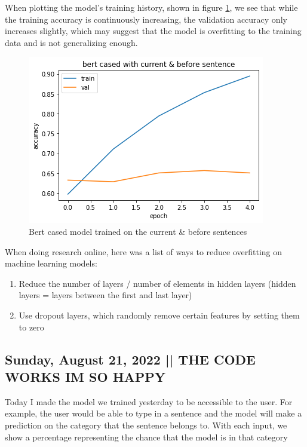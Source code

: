 \documentclass[11pt,letterpaper]{article}
\begin{document}
When plotting the model's training history, shown in figure \ref{fig:bert_cased_w_before}, we see that while the training accuracy is continuously increasing, the validation accuracy only increases slightly, which may suggest that the model is overfitting to the training data and is not generalizing enough.

\begin{figure}
    \centering
    \includegraphics[scale=0.7]{images/bert_cased_w_before.png}
    \caption{Bert cased model trained on the current & before sentences}
    \label{fig:bert_cased_w_before}
\end{figure}

When doing research online, here was a list of ways to reduce overfitting on machine learning models:
\begin{enumerate}
    \item Reduce the number of layers / number of elements in hidden layers (hidden layers = layers between the first and last layer)
    \item Use dropout layers, which randomly remove certain features by setting them to zero
\end{enumerate}


\subsection{Sunday, August 21, 2022 || THE CODE WORKS IM SO HAPPY}
Today I made the model we trained yesterday to be accessible to the user. For example, the user would be able to type in a sentence and the model will make a prediction on the category that the sentence belongs to. With each input, we show a percentage representing the chance that the model is in that category
\end{document}
